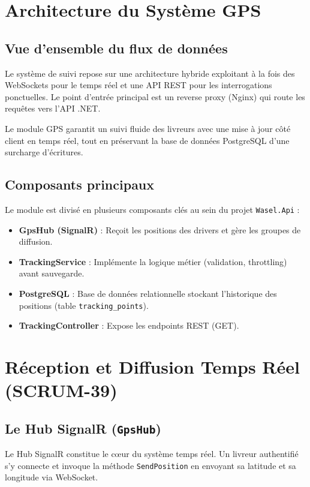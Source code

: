 \documentclass[11pt,a4paper]{report}
\begin{document}
\chapter{Architecture du Système GPS}
\section{Vue d'ensemble du flux de données}
Le système de suivi repose sur une architecture hybride exploitant à la fois des WebSockets pour le temps réel et une API REST pour les interrogations ponctuelles. Le point d'entrée principal est un reverse proxy (Nginx) qui route les requêtes vers l'API .NET.

\begin{definitionbox}
Le module GPS garantit un suivi fluide des livreurs avec une mise à jour côté client en temps réel, tout en préservant la base de données PostgreSQL d'une surcharge d'écritures.
\end{definitionbox}

\section{Composants principaux}
Le module est divisé en plusieurs composants clés au sein du projet \texttt{Wasel.Api} :
\begin{itemize}
    \item \textbf{GpsHub (SignalR)} : Reçoit les positions des drivers et gère les groupes de diffusion.
    \item \textbf{TrackingService} : Implémente la logique métier (validation, throttling) avant sauvegarde.
    \item \textbf{PostgreSQL} : Base de données relationnelle stockant l'historique des positions (table \texttt{tracking\_points}).
    \item \textbf{TrackingController} : Expose les endpoints REST (GET).
\end{itemize}

\chapter{Réception et Diffusion Temps Réel (SCRUM-39)}
\section{Le Hub SignalR (\texttt{GpsHub})}
Le Hub SignalR constitue le cœur du système temps réel. Un livreur authentifié s'y connecte et invoque la méthode \texttt{SendPosition} en envoyant sa latitude et sa longitude via WebSocket.
\end{document}
